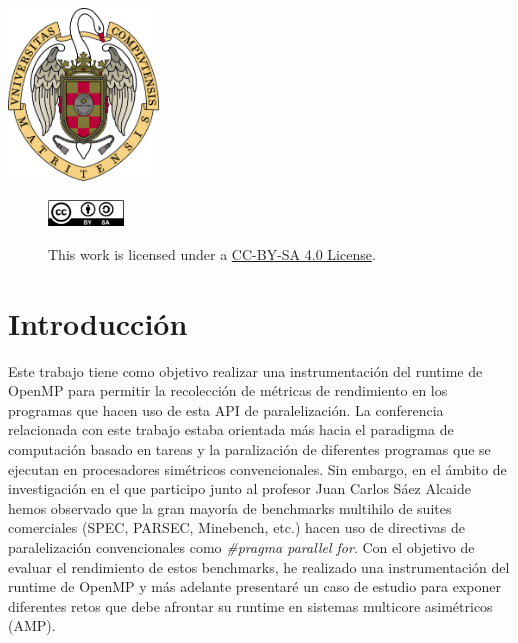 \begin{titlepage}
\includegraphics[width=4cm,keepaspectratio]{logo.png}
 

\vfill %



\captionsetup[figure]{labelformat=empty,justification=raggedright,singlelinecheck=false}
\begin{figure}[h]

        \includegraphics[width=2cm,keepaspectratio]{cc-by-sa.png}
        \label{fig:by-sa}
        \caption{ This work is licensed under a \href{https://creativecommons.org/licenses/by/4.0/legalcode}{CC-BY-SA 4.0 License}.}

\end{figure}

\end{titlepage}

\tableofcontents
\clearpage



\section{Introducción}\label{sec:intro}

Este trabajo tiene como objetivo realizar una instrumentación del runtime de OpenMP para permitir la recolección de métricas de rendimiento en los programas que hacen uso de esta API de paralelización. La conferencia relacionada con este trabajo estaba orientada más hacia el paradigma de computación basado en tareas y la paralización de diferentes programas que se ejecutan en procesadores simétricos convencionales. Sin embargo, en el ámbito de investigación en el que participo junto al profesor Juan Carlos Sáez Alcaide hemos observado que la gran mayoría de benchmarks multihilo de suites comerciales (SPEC, PARSEC, Minebench, etc.) hacen uso de directivas de paralelización convencionales como \textit{\#pragma parallel for}. Con el objetivo de evaluar el rendimiento de estos benchmarks, he realizado una instrumentación del runtime de OpenMP y más adelante presentaré un caso de estudio para exponer diferentes retos que debe afrontar su runtime en sistemas multicore asimétricos (AMP).

